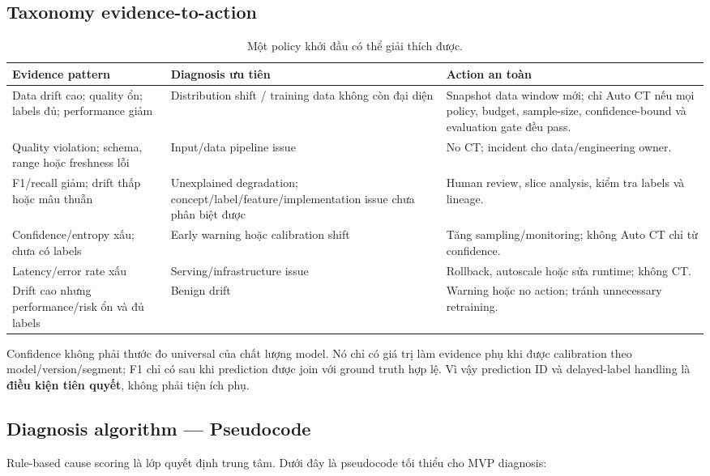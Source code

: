\documentclass[11pt,a4paper]{article}
\begin{document}
\subsection{Taxonomy evidence-to-action}
\begin{table}[ht]
\centering
\small
\caption{Một policy khởi đầu có thể giải thích được.}\label{tab:policy}
\begin{tabularx}{\linewidth}{@{}p{3.2cm}Y Y@{}}
\toprule
\textbf{Evidence pattern} & \textbf{Diagnosis ưu tiên} & \textbf{Action an toàn} \\
\midrule
Data drift cao; quality ổn; labels đủ; performance giảm & Distribution shift / training data không còn đại diện & Snapshot data window mới; chỉ Auto CT nếu mọi policy, budget, sample-size, confidence-bound và evaluation gate đều pass. \\
Quality violation; schema, range hoặc freshness lỗi & Input/data pipeline issue & No CT; incident cho data/engineering owner. \\
F1/recall giảm; drift thấp hoặc mâu thuẫn & Unexplained degradation; concept/label/feature/implementation issue chưa phân biệt được & Human review, slice analysis, kiểm tra labels và lineage. \\
Confidence/entropy xấu; chưa có labels & Early warning hoặc calibration shift & Tăng sampling/monitoring; không Auto CT chỉ từ confidence. \\
Latency/error rate xấu & Serving/infrastructure issue & Rollback, autoscale hoặc sửa runtime; không CT. \\
Drift cao nhưng performance/risk ổn và đủ labels & Benign drift & Warning hoặc no action; tránh unnecessary retraining. \\
\bottomrule
\end{tabularx}
\end{table}

Confidence không phải thước đo universal của chất lượng model. Nó chỉ có giá trị làm evidence phụ khi được calibration theo model/version/segment; F1 chỉ có sau khi prediction được join với ground truth hợp lệ. Vì vậy prediction ID và delayed-label handling là \textbf{điều kiện tiên quyết}, không phải tiện ích phụ.

\subsection{Diagnosis algorithm --- Pseudocode}\label{subsec:diagnosis}

Rule-based cause scoring là lớp quyết định trung tâm. Dưới đây là pseudocode tối thiểu cho MVP diagnosis:
\end{document}
